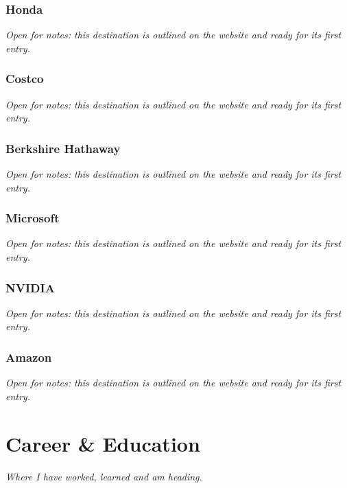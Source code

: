\documentclass{article}
\begin{document}
\subsubsection{Honda}\label{sec:honda}
\textit{Open for notes: this destination is outlined on the website and ready for its first entry.}

\subsubsection{Costco}\label{sec:costco}
\textit{Open for notes: this destination is outlined on the website and ready for its first entry.}

\subsubsection{Berkshire Hathaway}\label{sec:berkshire-hathaway}
\textit{Open for notes: this destination is outlined on the website and ready for its first entry.}

\subsubsection{Microsoft}\label{sec:microsoft}
\textit{Open for notes: this destination is outlined on the website and ready for its first entry.}

\subsubsection{NVIDIA}\label{sec:nvidia}
\textit{Open for notes: this destination is outlined on the website and ready for its first entry.}

\subsubsection{Amazon}\label{sec:amazon}
\textit{Open for notes: this destination is outlined on the website and ready for its first entry.}

\section{Career \& Education}\label{sec:career-and-education}
\textit{Where I have worked, learned and am heading.}
\end{document}
